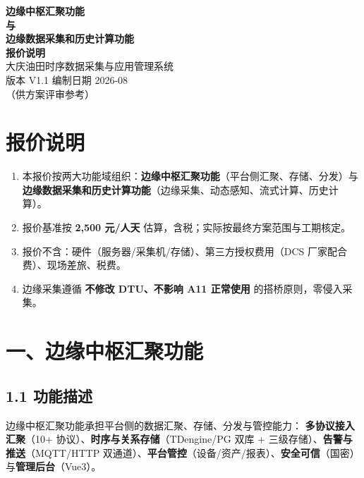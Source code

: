 \documentclass[11pt,a4paper]{ctexart}
\begin{document}
\begin{center}
{\Huge\bfseries 边缘中枢汇聚功能\\[6pt] 与\\[6pt] 边缘数据采集和历史计算功能\\[12pt] 报价说明}\\[12pt]
{\large 大庆油田时序数据采集与应用管理系统}\\[8pt]
{\large 版本 V1.1 \quad 编制日期 2026-08}\\[4pt]
{\large （供方案评审参考）}
\end{center}

\vspace{1em}
\noindent\hrulefill
\vspace{1em}

\section{报价说明}

\begin{enumerate}[leftmargin=*]
  \item 本报价按两大功能域组织：\textbf{边缘中枢汇聚功能}（平台侧汇聚、存储、分发）与\textbf{边缘数据采集和历史计算功能}（边缘采集、动态感知、流式计算、历史计算）。
  \item 报价基准按 \textbf{2,500 元/人天} 估算，含税；实际按最终方案范围与工期核定。
  \item 报价不含：硬件（服务器/采集机/存储）、第三方授权费用（DCS 厂家配合费）、现场差旅、税费。
  \item 边缘采集遵循 \textbf{不修改 DTU、不影响 A11 正常使用} 的搭桥原则，零侵入采集。
\end{enumerate}

\section{一、边缘中枢汇聚功能}

\subsection{1.1 功能描述}

边缘中枢汇聚功能承担平台侧的数据汇聚、存储、分发与管控能力：
\textbf{多协议接入汇聚}（10+ 协议）、\textbf{时序与关系存储}（TDengine/PG 双库 + 三级存储）、\textbf{告警与推送}（MQTT/HTTP 双通道）、\textbf{平台管控}（设备/资产/报表）、\textbf{安全可信}（国密）与\textbf{管理后台}（Vue3）。
\end{document}
